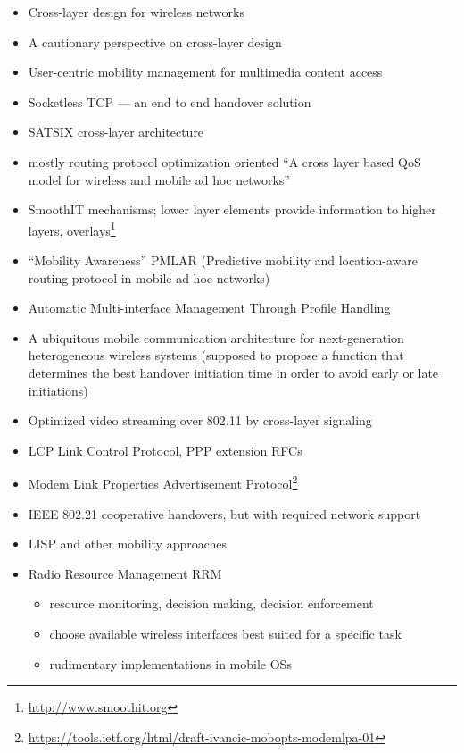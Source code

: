 \begin{itemize}
	\item Cross-layer design for wireless networks \cite{1235598}
	\item A cautionary perspective on cross-layer design \cite{1404568}
	\item User-centric mobility management for multimedia content access \cite{bolla2011usercentric}
	\item Socketless \gls{TCP} --- an end to end handover solution \cite{1635680}
	\item SATSIX cross-layer architecture \cite{4656786}
	\item mostly routing protocol optimization oriented ``A cross layer based QoS model for wireless and mobile ad hoc networks'' \cite{krishna2007cross}
	\item SmoothIT mechanisms; lower layer elements provide information to higher layers, overlays\footnote{\url{http://www.smoothit.org}}  \cite{oechsner2009pushing}
	\item ``Mobility Awareness'' \cite{hummel2010mobilitaet} PMLAR (Predictive mobility and location-aware routing protocol in mobile ad hoc networks)
	\item Automatic Multi-interface Management Through Profile Handling \cite{Bonnin:2009:AMM:1503496.1503498}
	\item A ubiquitous mobile communication architecture for next-generation heterogeneous wireless systems \cite{1452832} (supposed to propose a function that determines the best handover initiation time in order to avoid early or late initiations)
	\item Optimized video streaming over 802.11 by cross-layer signaling \cite{1580941}
	\item LCP Link Control Protocol, PPP extension RFCs \cite{rfc1570,rfc1661}
 	\item Modem Link Properties Advertisement Protocol\footnote{\url{https://tools.ietf.org/html/draft-ivancic-mobopts-modemlpa-01}}
	\item IEEE 802.21 cooperative handovers, but with required network support
	\item LISP and other mobility approaches \cite{rfc6830}
	\item Radio Resource Management RRM
		\begin{itemize}
			\item resource monitoring, decision making, decision enforcement
			\item choose available wireless interfaces  best suited for a specific task
			\item rudimentary implementations in mobile OSs
		\end{itemize}
\end{itemize}




